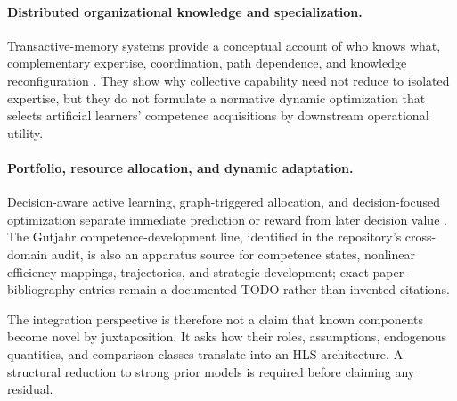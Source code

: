 \paragraph{Distributed organizational knowledge and specialization.} Transactive-memory systems provide a conceptual account of who knows what, complementary expertise, coordination, path dependence, and knowledge reconfiguration \citep{argote2012transactive}. They show why collective capability need not reduce to isolated expertise, but they do not formulate a normative dynamic optimization that selects artificial learners' competence acquisitions by downstream operational utility.

\paragraph{Portfolio, resource allocation, and dynamic adaptation.} Decision-aware active learning, graph-triggered allocation, and decision-focused optimization separate immediate prediction or reward from later decision value \citep{bickfordsmith2023prediction,filstroff2024targeted,genalti2024graph,elmachtoub2021smart,wang2023scalable}. The Gutjahr competence-development line, identified in the repository's cross-domain audit, is also an apparatus source for competence states, nonlinear efficiency mappings, trajectories, and strategic development; exact paper-bibliography entries remain a documented TODO rather than invented citations.

The integration perspective is therefore not a claim that known components become novel by juxtaposition. It asks how their roles, assumptions, endogenous quantities, and comparison classes translate into an HLS architecture. A structural reduction to strong prior models is required before claiming any residual.
